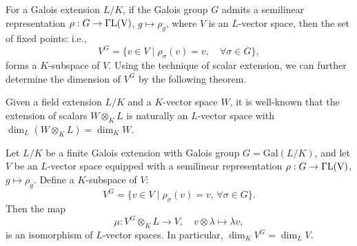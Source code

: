 \documentclass[hidelinks,onefignum,onetabnum]{siamart251216}
\theoremstyle{definition}
\theoremstyle{remark}
\begin{document}

For a Galois extension $L/K$, if the Galois group $G$ admits a semilinear representation $\rho : G\to \Gamma\rm{L}(V)$, $g\mapsto \rho_{g} $, where $V$ is an $L$-vector space, then the set of fixed points: i.e., $$V^G = \{v \in V \mid \rho_{\sigma}(v) = v, \quad \forall \sigma \in G\},$$ forms a $K$-subspace of $V$. Using the technique of scalar extension, we can further determine the dimension of $V^G$ by the following theorem. 


Given a field extension $L/K$ and
a $K$-vector space $W$, it is well-known that the extension of scalars $W\otimes_{K}L$ is naturally an $L$-vector space with $\dim_{L}(W\otimes_{K}L)
=\dim_{K}W$. 


\begin{theorem}\label{thm:galois-descent}
	Let $L/K$ be a finite Galois extension with Galois group $G = \mathrm{Gal}(L/K)$, and let
	$V$ be an $L$-vector space equipped with a semilinear representation $\rho : G\to \Gamma\rm{L}(V)$, $g\mapsto \rho_{g} $. Define a $K$-subspace of $V$:  $$V^G = \{v \in V \mid \rho_{\sigma}(v) = v, \, \forall \sigma \in G\}.$$ Then the
	map
	\[
	\mu \colon V^{G}\otimes_{K}L \longrightarrow V,
	\quad
	v\otimes \lambda \longmapsto \lambda v,
	\]
	is an isomorphism of $L$-vector spaces. In particular,
	$\dim_{K}V^{G}=\dim_{L}V$.
\end{theorem}
\end{document}
